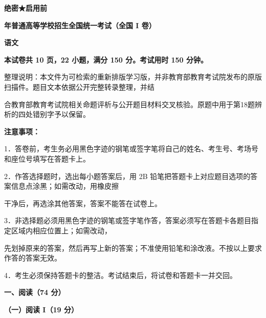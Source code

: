 \documentclass[UTF8,a4paper,fontset=fandol]{ctexart}
\begin{document}
\fontsize{8.6pt}{11.2pt}\selectfont
\sloppy
\textbf{绝密★启用前}\par
\vspace{0.35em}\par
\begin{center}\bfseries\fontsize{15pt}{19pt} 年普通高等学校招生全国统一考试（全国 I 卷）\end{center}
\fontsize{8.6pt}{11.2pt}\selectfont
\begin{center}\bfseries\fontsize{18pt}{22pt}\selectfont 语文\end{center}
\fontsize{8.6pt}{11.2pt}\selectfont
\begin{center}\bfseries 本试卷共 10 页，22 小题，满分 150 分。考试用时 150 分钟。\end{center}
\vspace{0.35em}\par
整理说明：本文件为可检索的重新排版学习版，并非教育部教育考试院发布的原版扫描件。题目文本依据公开完整转录整理，并结\par
合教育部教育考试院相关命题评析与公开题目材料交叉核验。原题中用于第18题辨析的四处错别字予以保留。\par
\vspace{0.35em}\par
\vspace{0.35em}\par
\textbf{注意事项：}\par
1．答卷前，考生务必用黑色字迹的钢笔或签字笔将自己的姓名、考生号、考场号和座位号填写在答题卡上。\par
2．作答选择题时，选出每小题答案后，用 2B 铅笔把答题卡上对应题目选项的答案信息点涂黑；如需改动，用橡皮擦\par
干净后，再选涂其他答案，答案不能答在试卷上。\par
3．非选择题必须用黑色字迹的钢笔或签字笔作答，答案必须写在答题卡各题目指定区域内相应位置上；如需改动，\par
先划掉原来的答案，然后再写上新的答案；不准使用铅笔和涂改液。不按以上要求作答的答案无效。\par
4．考生必须保持答题卡的整洁。考试结束后，将试卷和答题卡一并交回。\par
\vspace{0.35em}\par
\vspace{0.35em}\par
\vspace{0.25em}\textbf{一、阅读（74 分）}\par
\vspace{0.25em}\textbf{（一）阅读 I（19 分）}\par
\end{document}
